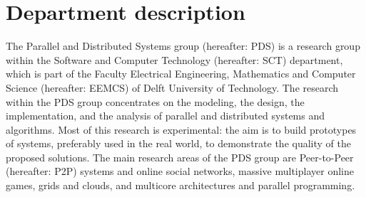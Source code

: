 \section{Department description}
The Parallel and Distributed Systems group (hereafter: PDS) is a research group within the Software and Computer Technology (hereafter: SCT) department, which is part of the Faculty Electrical Engineering, Mathematics and Computer Science (hereafter: EEMCS) of Delft University of Technology. The research within the PDS group concentrates on the modeling, the design, the implementation, and the analysis of parallel and distributed systems and algorithms. Most of this research is experimental: the aim is to build prototypes of systems, preferably used in the real world, to demonstrate the quality of the proposed solutions. The main research areas of the PDS group are Peer-to-Peer (hereafter: P2P) systems and online social networks, massive multiplayer online games, grids and clouds, and multicore architectures and parallel programming. 
